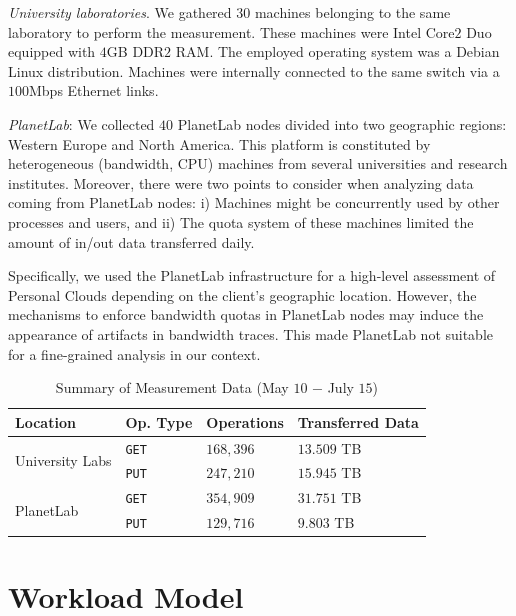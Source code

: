 \textit{University laboratories}. We gathered $30$ machines
belonging to the same laboratory to perform the measurement.
These machines were Intel Core$2$ Duo equipped with $4$GB DDR$2$ RAM. 
The employed operating system was a Debian Linux distribution. 
Machines were internally connected to the same switch via a $100$Mbps Ethernet links.

\textit{PlanetLab}: We collected $40$ PlanetLab nodes divided into
two geographic regions: Western Europe and North America. 
This platform is constituted by heterogeneous (bandwidth, CPU) machines from several
universities and research institutes. Moreover, there were two points to consider
when analyzing data coming from PlanetLab nodes: i) Machines might be concurrently
used by other processes and users, and ii) The quota system of these machines
limited the amount of in/out data transferred daily. 

Specifically, we used the PlanetLab infrastructure for
a high-level assessment of Personal Clouds depending on the 
client's geographic location. 
However, the mechanisms to enforce bandwidth quotas
in PlanetLab nodes may induce the appearance of artifacts 
in bandwidth traces. This made PlanetLab not 
suitable for a fine-grained analysis in our context.
   
\begin{table}%
\begin{center}

\begin{tabular}{|l|l|l|l|}
\hline
Location & Op. Type & Operations & Transferred Data \\ \hline
\multirow{2}{*}{University Labs}
 & \texttt{GET} & $168,396$ & $13.509$ TB\\
 & \texttt{PUT} & $247,210$ & $15.945$ TB\\ \hline
\multirow{2}{*}{PlanetLab}
 & \texttt{GET} & $354,909$ & $31.751$ TB\\
 & \texttt{PUT} & $129,716$ & $9.803$ TB\\ \hline
\end{tabular}
\caption{Summary of Measurement Data (May $10$ $-$ July $15$)}
\vspace{-9mm}
\label{tab:measurement_data}
\end{center}
\end{table}

\section{Workload Model} 

